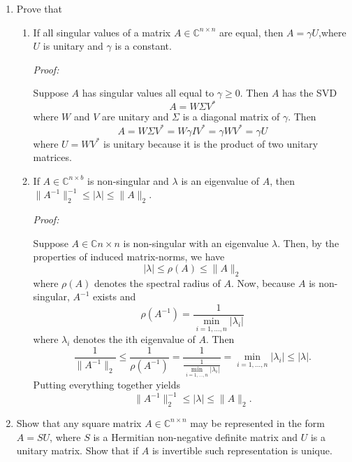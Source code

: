 \documentclass[a4paper,12pt]{article}
\newcommand{\comps}{\mathbb{C}}
\newcommand{\abs}[1]{\left| #1 \right|}
\newcommand{\norm}[1]{\lVert #1 \rVert}
\newenvironment{proof}[2][$\square$]
    {\setlength{\parskip}{0pt}\par\textit{Proof:} #2\setlength{\parskip}{0.25cm}
        \savebox{\qed}{#1}
        \begin{adjustwidth}{\widthof{Proof:}}{}
    }
    {
        \hfill\usebox{\qed}\end{adjustwidth}
    }
\begin{document}
\begin{enumerate}[label = (\arabic*)]
	\item Prove that
	\begin{enumerate}[label = (\alph*)]
		\item If all singular values of a matrix $ A \in \comps^{n \times n} $ are equal, then $ A = \gamma U $,where $ U $ is unitary and $ \gamma $ is a constant.
		
		\begin{proof}{}
			Suppose $ A $ has singular values all equal to $ \gamma \geq 0 $. Then $ A $ has the SVD
			\[
				A = W \Sigma V^*
			\]
			where $ W $ and $ V $ are unitary and $ \Sigma $ is a diagonal matrix of $ \gamma $. Then
			\[
				A = W \Sigma V^* 
				    = W \gamma I V^* 
				    = \gamma W V^* 
				    = \gamma U
			\]
			where $ U = W V^* $ is unitary because it is the product of two unitary matrices.
		\end{proof}
	
		\item If $ A \in \comps^{n \times b} $ is non-singular and $ \lambda $ is an eigenvalue of $ A $, then $ \norm{A^{-1}}^{-1}_2 \leq \abs{\lambda} \leq \norm{A}_2 $.
		
		\begin{proof}{}
			Suppose $ A \in \comps{n \times n} $ is non-singular with an eigenvalue $ \lambda $. Then, by the properties of induced matrix-norms, we have
			\[
				\abs{\lambda} \leq \rho(A) \leq \norm{A}_2
			\]
			where $ \rho(A) $ denotes the spectral radius of $ A $. Now, because $ A $ is non-singular, $ A^{-1} $ exists and 
			\[
				\rho(A^{-1}) = \frac{1}{\min\limits_{i = 1, \ldots, n} \abs{\lambda_i}}
			\]
			where $ \lambda_i $ denotes the ith eigenvalue of $ A $. Then
			\[
				\frac{1}{\norm{A^{-1}}_2} \leq \frac{1}{\rho(A^{-1})} 
				= \frac{1}{\frac{1}{\min\limits_{i = 1, \ldots, n} \abs{\lambda_i}}} 
				= \min\limits_{i = 1, \ldots, n} \abs{\lambda_i} 
				\leq \abs{\lambda}.
			\]
			Putting everything together yields
			\[
				\norm{A^{-1}}^{-1}_2 \leq \abs{\lambda} \leq \norm{A}_2.
			\]
		\end{proof}
	\end{enumerate}

	\item Show that any square matrix $ A \in \comps^{n \times n} $ may be represented in the form $ A = SU $, where $ S $ is a Hermitian non-negative definite matrix and $ U $ is a unitary matrix. Show that if $ A $ is invertible such representation is unique.
	

\end{enumerate}
\end{document}
